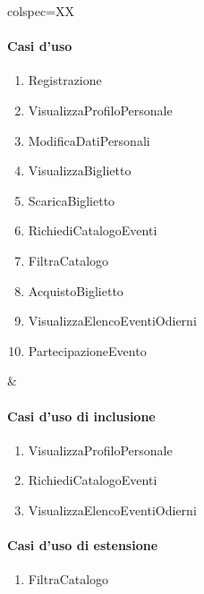 \begin{table}[!hbp]
	\centering
	\begin{tblr}{colspec=XX}
		\begin{minipage}[t]{\linewidth}
			\paragraph{Casi d'uso}
			\begin{enumerate}
				\item Registrazione 
				\item VisualizzaProfiloPersonale
				\item ModificaDatiPersonali
				\item VisualizzaBiglietto
				\item ScaricaBiglietto
				\item RichiediCatalogoEventi
				\item FiltraCatalogo
				\item AcquistoBiglietto
				\item VisualizzaElencoEventiOdierni
				\item PartecipazioneEvento
			\end{enumerate}
		\end{minipage} &
		\begin{minipage}[t]{\linewidth}
			\paragraph{Casi d'uso di inclusione}
			\begin{enumerate}
                \item VisualizzaProfiloPersonale
                \item RichiediCatalogoEventi
                \item VisualizzaElencoEventiOdierni
			\end{enumerate}
			\paragraph{Casi d'uso di estensione}
			\begin{enumerate}
				\item FiltraCatalogo
			\end{enumerate}
		\end{minipage}
	\end{tblr}
\end{table}
